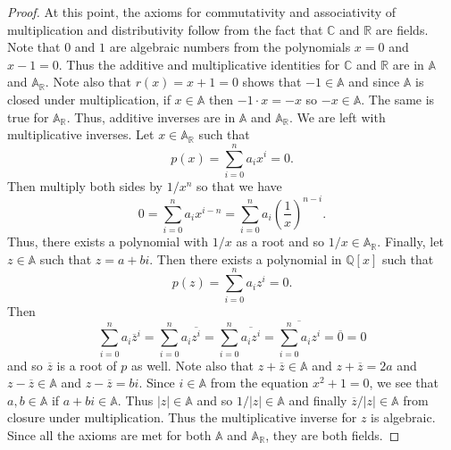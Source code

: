 \documentclass{article}
\begin{document}
\begin{flushleft}
\begin{proof}
At this point, the axioms for commutativity and associativity of multiplication and distributivity follow from the fact that $\mathbb{C}$ and $\mathbb{R}$ are fields. Note that $0$ and $1$ are algebraic numbers from the polynomials $x = 0$ and $x - 1 = 0$. Thus the additive and multiplicative identities for $\mathbb{C}$ and $\mathbb{R}$ are in $\mathbb{A}$ and $\mathbb{A}_{\mathbb{R}}$. Note also that $r(x) = x + 1 = 0$ shows that $-1 \in \mathbb{A}$ and since $\mathbb{A}$ is closed under multiplication, if $x \in \mathbb{A}$ then $-1 \cdot x = -x$ so $-x \in \mathbb{A}$. The same is true for $\mathbb{A}_{\mathbb{R}}$. Thus, additive inverses are in $\mathbb{A}$ and $\mathbb{A}_{\mathbb{R}}$. We are left with multiplicative inverses. Let $x \in \mathbb{A}_{\mathbb{R}}$ such that
\[
p(x) = \sum_{i=0}^{n} a_i x^i = 0.
\]
Then multiply both sides by $1/x^n$ so that we have
\[
0= \sum_{i=0}^{n} a_i x^{i-n} = \sum_{i=0}^{n} a_i \left ( \frac{1}{x} \right )^{n-i}.
\]
Thus, there exists a polynomial with $1/x$ as a root and so $1/x \in \mathbb{A}_{\mathbb{R}}$. Finally, let $z \in \mathbb{A}$ such that $z = a + bi$. Then there exists a polynomial in $\mathbb{Q}[x]$ such that
\[
p(z) = \sum_{i=0}^{n} a_i z^i = 0.
\]
Then
\[
\sum_{i=0}^{n} a_i \overline{z}^i = \sum_{i=0}^{n} a_i \overline{z^i} = \sum_{i=0}^{n} \overline{a_i z^i} = \overline{\sum_{i=0}^{n} a_i z^i} = \overline{0} = 0
\]
and so $\overline{z}$ is a root of $p$ as well. Note also that $z + \overline{z} \in \mathbb{A}$ and $z + \overline{z} = 2a$ and $z - \overline{z} \in \mathbb{A}$ and $z - \overline{z} = bi$. Since $i \in \mathbb{A}$ from the equation $x^2 + 1 = 0$, we see that $a, b \in \mathbb{A}$ if $a + bi \in \mathbb{A}$. Thus $|z| \in \mathbb{A}$ and so $1/|z| \in \mathbb{A}$ and finally $\overline{z}/|z| \in \mathbb{A}$ from closure under multiplication. Thus the multiplicative inverse for $z$ is algebraic. Since all the axioms are met for both $\mathbb{A}$ and $\mathbb{A}_{\mathbb{R}}$, they are both fields.
\end{proof}


\end{flushleft}
\end{document}
